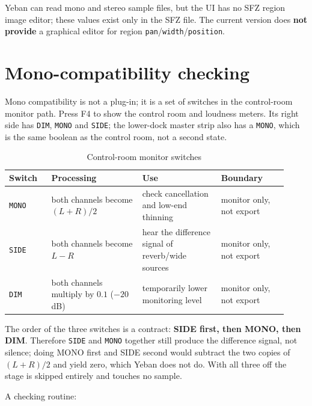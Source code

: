 Yeban can read mono and stereo sample files, but the UI has no SFZ region image editor; these values exist only in the SFZ file. The current version does \textbf{not provide} a graphical editor for region \texttt{pan}/\texttt{width}/\texttt{position}.

\section{Mono-compatibility checking}

Mono compatibility is not a plug-in; it is a set of switches in the control-room monitor path. Press F4 to show the control room and loudness meters. Its right side has \texttt{DIM}, \texttt{MONO} and \texttt{SIDE}; the lower-dock master strip also has a \texttt{MONO}, which is the same boolean as the control room, not a second state.


\begin{table}[htbp]
\centering
\small
\begin{tabular}{@{}p{0.14\linewidth}p{0.30\linewidth}p{0.26\linewidth}p{0.22\linewidth}@{}}
\hline
Switch & Processing & Use & Boundary \\
\hline
\texttt{MONO} & both channels become $(L+R)/2$ & check cancellation and low-end thinning & monitor only, not export \\
\texttt{SIDE} & both channels become $L-R$ & hear the difference signal of reverb/wide sources & monitor only, not export \\
\texttt{DIM} & both channels multiply by $0.1$ ($-20$ dB) & temporarily lower monitoring level & monitor only, not export \\
\hline
\end{tabular}
\caption{Control-room monitor switches}
\label{tab:monitor-controls}
\end{table}

The order of the three switches is a contract: \textbf{SIDE first, then MONO, then DIM}. Therefore \texttt{SIDE} and \texttt{MONO} together still produce the difference signal, not silence; doing MONO first and SIDE second would subtract the two copies of $(L+R)/2$ and yield zero, which Yeban does not do. With all three off the stage is skipped entirely and touches no sample.

A checking routine:

